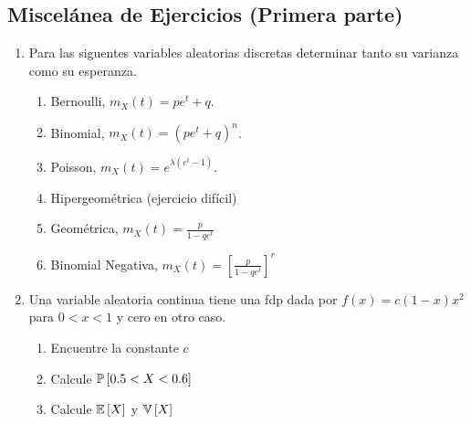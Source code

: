 \subsection{Miscel\'anea de Ejercicios (Primera parte)}

\begin{Ejer}
\begin{enumerate}
\item Para las siguentes variables aleatorias discretas determinar tanto su varianza como su esperanza.
\begin{enumerate}
\item Bernoulli, $m_{X}\left(t\right)=pe^{t}+q$.

\item Binomial, $m_{X}\left(t\right)=\left(pe^{t}+q\right)^{n}$.
\item Poisson, $m_{X}\left(t\right)=e^{\lambda\left(e^{t}-1\right)}$.
\item Hipergeométrica (ejercicio difícil)
\item Geométrica, $m_{X}\left(t\right)= \frac{p}{1-qe^{t}}$
\item Binomial Negativa, $m_{X}\left(t\right)= \left[\frac{p}{1-qe^{t}}\right]^{r}$
\end{enumerate}
\item Una variable aleatoria continua tiene una fdp dada por $f\left(x\right)=c\left(1-x\right)x^{2}$ para $0<x<1$ y cero en otro caso.
\begin{enumerate}
\item Encuentre la constante $c$
\item Calcule $\mathbb{P}\left[0.5<X<0.6\right]$
\item Calcule $\mathbb{E}\left[X\right]$ y $\mathbb{V}\left[X\right]$
\end{enumerate}
\end{enumerate}

\end{Ejer}


